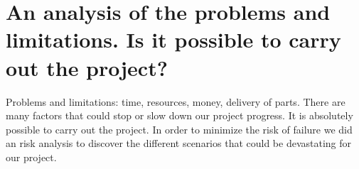 \section{An analysis of the problems and limitations. Is it possible to carry out the project?}

Problems and limitations: time, resources, money, delivery of parts.
There are many factors that could stop or slow down our project progress. It is absolutely possible to carry out the project. In order to minimize the risk of failure we did an risk analysis to discover the different scenarios that could be devastating for our project.